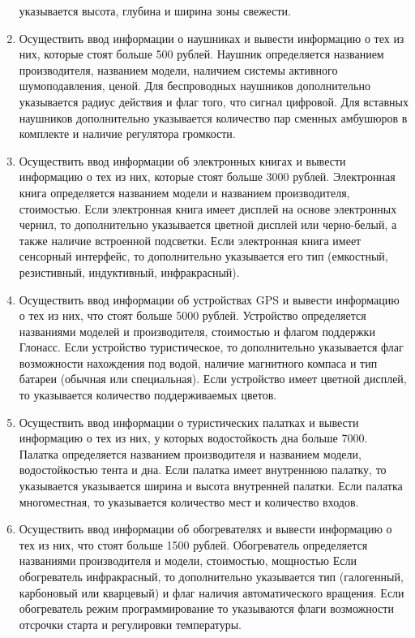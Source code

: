\begin{enumerate}
указывается высота, глубина и ширина зоны свежести.
\item Осуществить ввод информации о наушниках и вывести информацию о тех из них, которые стоят
больше 500 рублей. Наушник определяется названием производителя, названием модели, наличием системы активного шумоподавления, ценой. Для беспроводных наушников дополнительно
указывается радиус действия и флаг того, что сигнал цифровой. Для вставных наушников дополнительно указывается количество пар сменных амбушюров в комплекте и наличие регулятора
громкости.
\item Осуществить ввод информации об электронных книгах и вывести информацию о тех из них,
которые стоят больше 3000 рублей. Электронная книга определяется названием модели и названием производителя, стоимостью. Если электронная книга имеет дисплей на основе электронных чернил, то дополнительно указывается цветной дисплей или черно-белый, а также наличие
встроенной подсветки. Если электронная книга имеет сенсорный интерфейс, то дополнительно
указывается его тип (емкостный, резистивный, индуктивный, инфракрасный).
\item Осуществить ввод информации об устройствах GPS и вывести информацию о тех из них, что
стоят больше 5000 рублей. Устройство определяется названиями моделей и производителя, стоимостью и флагом поддержки Глонасс. Если устройство туристическое, то дополнительно указывается флаг возможности нахождения под водой, наличие магнитного компаса и тип батареи
(обычная или специальная). Если устройство имеет цветной дисплей, то указывается количество
поддерживаемых цветов.
\item Осуществить ввод информации о туристических палатках и вывести информацию о тех из них,
у которых водостойкость дна больше 7000. Палатка определяется названием производителя и
названием модели, водостойкостью тента и дна. Если палатка имеет внутреннюю палатку, то
указывается указывается ширина и высота внутренней палатки. Если палатка многоместная, то
указывается количество мест и количество входов.
\item Осуществить ввод информации об обогревателях и вывести информацию о тех из них, что стоят
больше 1500 рублей. Обогреватель определяется названиями производителя и модели, стоимостью, мощностью Если обогреватель инфракрасный, то дополнительно указывается тип (галогенный, карбоновый или кварцевый) и флаг наличия автоматического вращения. Если обогреватель
режим программирование то указываются флаги возможности отсрочки старта и регулировки
температуры.

\end{enumerate}

